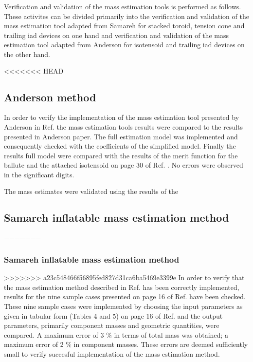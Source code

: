 Verification and validation of the mass estimation tools is performed as follows. These activites can be divided primarily into the verification and validation of the mass estimation tool adapted from Samareh \cite{Samareh2011} for stacked toroid, tension cone and trailing \gls{iad} devices on one hand and verification and validation of the mass estimation tool adapted from Anderson \cite{Anderson1969} for isotensoid and trailing \gls{iad} devices on the other hand. 

<<<<<<< HEAD
\subsection{Anderson method}
In order to verify the implementation of the mass estimation tool presented by Anderson in Ref. \cite{Anderson1969} the mass estimation tools results were compared to the results presented in Anderson paper. The full estimation model was implemented and consequently checked with the coefficients of the simplified model. Finally the results full model were compared with the results of the merit function for the ballute and the attached isotensoid on page 30 of Ref. \cite{Anderson1969}. No errors were observed in the significant digits.

The mass estimates were validated using the results of the

\subsection{Samareh inflatable mass estimation method}
=======
\subsubsection{Samareh inflatable mass estimation method}
>>>>>>> a23c548466f56895fed827d31ca6ba5469e3399e
In order to verify that the mass estimation method described in Ref.\cite{Samareh2011} has been correctly implemented, results for the nine sample cases presented on page 16 of Ref.\cite{Samareh2011} have been checked. These nine sample cases were implemented by choosing the input parameters as given in tabular form (Tables 4 and 5) on page 16 of Ref.\cite{Samareh2011} and the output parameters, primarily component masses and geometric quantities, were compared. A maximum error of 3 $\%$ in terms of total mass was obtained; a maximum error of 2 $\%$ in component masses. These errors are deemed sufficiently small to verify succesful implementation of the mass estimation method.

